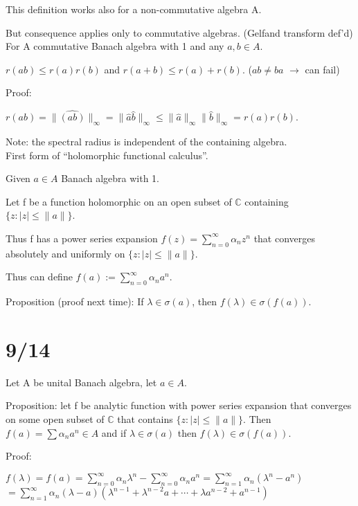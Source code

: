 \documentclass[12pt]{article}
\begin{document}
This definition works also for a non-commutative algebra A.

But consequence applies only to commutative algebras. (Gelfand transform def'd)\\

\noindent
For A commutative Banach algebra with 1 and any $a, b \in A$.

$r(ab) \leq r(a)r(b)$ and $r(a + b) \leq r(a) + r(b)$. ($ab \neq ba$ $\to$ can fail)

\noindent
Proof:

$r(ab) = \|\hat{(ab)}\|_\infty = \|\hat{a}\hat{b}\|_\infty \leq \|\hat{a}\|_\infty\|\hat{b}\|_\infty = r(a)r(b)$.

\noindent
Note: the spectral radius is independent of the containing algebra.\\

\noindent
First form of ``holomorphic functional calculus''.

\noindent
Given $a \in A$ Banach algebra with 1.

Let f be a function holomorphic on an open subset of $\mathds{C}$ containing $\{z : |z| \leq \|a\|\}$.

Thus f has a power series expansion $f(z) = \sum_{n = 0}^\infty \alpha_nz^n$ that converges absolutely and uniformly on $\{z : |z| \leq \|a\|\}$.

Thus can define $f(a) := \sum_{n = 0}^\infty\alpha_n a^n$.

\noindent
Proposition (proof next time): If $\lambda \in \sigma(a)$, then $f(\lambda) \in \sigma(f(a))$.

\section{9/14}

Let A be unital Banach algebra, let $a \in A$.

\noindent
Proposition: let f be analytic function with power series expansion that converges on some open subset of $\mathds{C}$ that contains $\{z : |z| \leq \|a\|\}$.  Then $f(a) = \sum \alpha_n a^n \in A$ and if $\lambda \in \sigma(a)$ then $f(\lambda) \in \sigma(f(a))$.

\noindent
Proof:

$f(\lambda) = f(a) = \sum_{n=0}^\infty \alpha_n\lambda^n - \sum_{n=0}^\infty \alpha_na^n = \sum_{n = 1}^\infty \alpha_n(\lambda^n - a^n)$\\

$ = \sum_{n = 1}^\infty \alpha_n(\lambda - a)(\lambda^{n - 1} + \lambda^{n - 2}a + \cdots + \lambda a^{n - 2} + a^{n - 1})$\\
\end{document}
